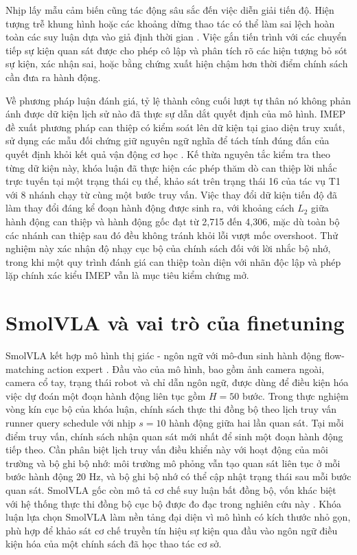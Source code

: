 Nhịp lấy mẫu cảm biến cũng tác động sâu sắc đến việc diễn giải tiến độ. Hiện tượng trễ khung hình hoặc các khoảng dừng thao tác có thể làm sai lệch hoàn toàn các suy luận dựa vào giả định thời gian \cite{clockvla2026}. Việc gắn tiến trình với các chuyển tiếp sự kiện quan sát được cho phép cô lập và phân tích rõ các hiện tượng bỏ sót sự kiện, xác nhận sai, hoặc bằng chứng xuất hiện chậm hơn thời điểm chính sách cần đưa ra hành động.

Về phương pháp luận đánh giá, tỷ lệ thành công cuối lượt tự thân nó không phản ánh được dữ kiện lịch sử nào đã thực sự dẫn dắt quyết định của mô hình. IMEP đề xuất phương pháp can thiệp có kiểm soát lên dữ kiện tại giao diện truy xuất, sử dụng các mẫu đối chứng giữ nguyên ngữ nghĩa để tách tính đúng đắn của quyết định khỏi kết quả vận động cơ học \cite{imep2026}. Kế thừa nguyên tắc kiểm tra theo từng dữ kiện này, khóa luận đã thực hiện các phép thăm dò can thiệp lời nhắc trực tuyến tại một trạng thái cụ thể, khảo sát trên trạng thái 16 của tác vụ T1 với 8 nhánh chạy từ cùng một bước truy vấn. Việc thay đổi dữ kiện tiến độ đã làm thay đổi đáng kể đoạn hành động được sinh ra, với khoảng cách $L_2$ giữa hành động can thiệp và hành động gốc đạt từ 2,715 đến 4,306, mặc dù toàn bộ các nhánh can thiệp sau đó đều không tránh khỏi lỗi vượt mốc overshoot. Thử nghiệm này xác nhận độ nhạy cục bộ của chính sách đối với lời nhắc bộ nhớ, trong khi một quy trình đánh giá can thiệp toàn diện với nhãn độc lập và phép lặp chính xác kiểu IMEP vẫn là mục tiêu kiểm chứng mở.

\section{SmolVLA và vai trò của finetuning}

SmolVLA kết hợp mô hình thị giác - ngôn ngữ với mô-đun sinh hành động flow-matching \cite{flowmatching2023} action expert \cite{smolvla2025}. Đầu vào của mô hình, bao gồm ảnh camera ngoài, camera cổ tay, trạng thái robot và chỉ dẫn ngôn ngữ, được dùng để điều kiện hóa việc dự đoán một đoạn hành động liên tục gồm $H=50$ bước. Trong thực nghiệm vòng kín cục bộ của khóa luận, chính sách thực thi đồng bộ theo lịch truy vấn runner query schedule với nhịp $s=10$ hành động giữa hai lần quan sát. Tại mỗi điểm truy vấn, chính sách nhận quan sát mới nhất để sinh một đoạn hành động tiếp theo. Cần phân biệt lịch truy vấn điều khiển này với hoạt động của môi trường và bộ ghi bộ nhớ: môi trường mô phỏng vẫn tạo quan sát liên tục ở mỗi bước hành động 20 Hz, và bộ ghi bộ nhớ có thể cập nhật trạng thái sau mỗi bước quan sát. SmolVLA gốc còn mô tả cơ chế suy luận bất đồng bộ, vốn khác biệt với hệ thống thực thi đồng bộ cục bộ được đo đạc trong nghiên cứu này \cite{smolvla2025,smolvlaCheckpoint}. Khóa luận lựa chọn SmolVLA làm nền tảng đại diện vì mô hình có kích thước nhỏ gọn, phù hợp để khảo sát cơ chế truyền tín hiệu sự kiện qua đầu vào ngôn ngữ điều kiện hóa của một chính sách đã học thao tác cơ sở.

